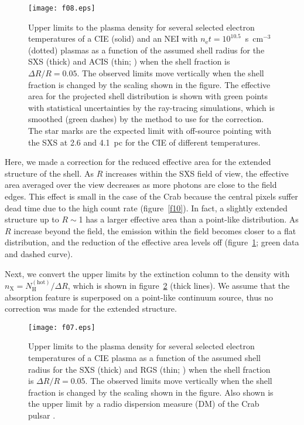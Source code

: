 \documentclass[]{pasj01}
\begin{document}
\begin{figure}
 \begin{center}
  \texttt{[image: f08.eps]}
 \end{center}
 \caption{Upper limits to the plasma density for several selected electron temperatures
 of a CIE (solid) and an NEI with $n_{\mathrm{e}}t=10^{10.5}$~s~cm$^{-3}$ (dotted)
 plasmas as a function of the assumed shell radius for the SXS (thick) and ACIS (thin;
 \cite{seward06}) when the shell fraction is $\Delta R/R=0.05$. The observed limits move
 vertically when the shell fraction is changed by the scaling shown in the figure. The
 effective area for the projected shell distribution is shown with green points with 
 statistical uncertainties by the ray-tracing simulations, which is smoothed (green
 dashes) by the \citet{savitzky64} method to use for the correction. The star marks are
 the expected limit with off-source pointing with the SXS at 2.6 and 4.1~pc for the CIE of
 different temperatures.}
\label{f08}
\end{figure}

Here, we made a correction for the reduced effective area for the extended structure of
the shell. As $R$ increases within the SXS field of view, the effective area averaged
over the view decreases as more photons are close to the field edges. This effect is
small in the case of the Crab because the central pixels suffer dead time due to the high
count rate (figure~\ref{f10}). In fact, a slightly extended structure up to
$R\sim$1 has a larger effective area than a point-like distribution. As $R$
increase beyond the field, the emission within the field becomes closer to a flat
distribution, and the reduction of the effective area levels off (figure~\ref{f08};
green data and dashed curve).

Next, we convert the upper limits by the extinction column to the density with
$n_{\mathrm{X}} = N_{\mathrm{H}}^{\mathrm{(hot)}}/\Delta R$, which is shown in
figure~\ref{f07} (thick lines). We assume that the absorption feature is superposed on a
point-like continuum source, thus no correction was made for the extended structure.

\begin{figure}
 \begin{center}
  \texttt{[image: f07.eps]}
 \end{center}
 \caption{Upper limits to the plasma density for several selected electron temperatures
 of a CIE plasma as a function of the assumed shell radius for the SXS (thick) and RGS
 (thin; \cite{kaastra09}) when the shell fraction is $\Delta R/R=0.05$. The observed
 limits move vertically when the shell fraction is changed by the scaling shown in the
 figure. Also shown is the upper limit by a radio dispersion measure (DM) of the Crab
 pulsar \citep{lundgren95}.}
\label{f07}
\end{figure}
\end{document}

